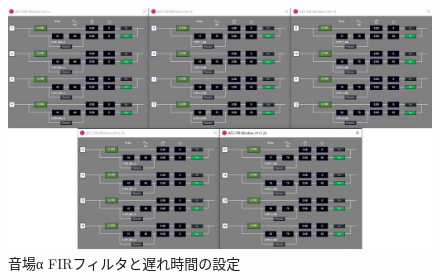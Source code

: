 \documentclass[11pt,a4j]{jreport}
\begin{document}
\begin{figure}[H]
  \centering
  \includegraphics[width=.8\linewidth]{images/experimentField/afcParameters/01alpha/02FIR.jpg}
  \caption{音場α FIRフィルタと遅れ時間の設定}
  \label{fig:alphaFIRフィルタの設定}
\end{figure}
\end{document}
